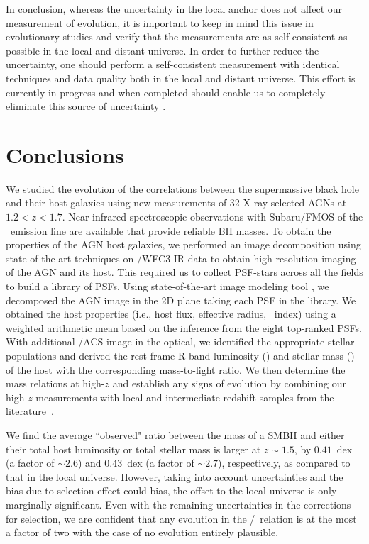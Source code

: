 \documentclass[apj]{emulateapj}
\begin{document}
In conclusion, whereas the uncertainty in the local anchor does not affect our measurement of evolution, it is important to keep in mind this issue in evolutionary studies and verify that the measurements are as self-consistent as possible in the local and distant universe. In order to further reduce the uncertainty, one should perform a self-consistent measurement with identical techniques and data quality both in the local and distant universe. This effort is currently in progress and when completed should enable us to completely eliminate this source of uncertainty \citep{Bennert11,Harris2012, Bennert2015}.


\section{Conclusions} \label{sec:sum}

We studied the evolution of the correlations between the supermassive black hole and their host galaxies using new measurements of 32 X-ray selected AGNs at $1.2<z<1.7$. Near-infrared spectroscopic observations with Subaru/FMOS of the \halpha\ emission line are available that provide reliable BH masses. To obtain the properties of the AGN host galaxies, we performed an image decomposition using state-of-the-art techniques on \hst/WFC3 IR data to obtain high-resolution imaging of the AGN and its host. This required us to collect PSF-stars across all the fields to build a library of PSFs. Using state-of-the-art image modeling tool \lenstronomy, we decomposed the AGN image in the 2D plane taking each PSF in the library. We obtained the host properties (i.e., host flux, effective radius, \sersic\ index) using a weighted arithmetic mean based on the inference from the eight top-ranked PSFs. With additional \hst/ACS image in the optical, we identified the appropriate stellar populations and derived the rest-frame R-band luminosity (\lhost) and stellar mass (\smass) of the host with the corresponding mass-to-light ratio.
We then determine the mass relations at high-$z$ and establish any signs of evolution by combining our high-$z$ measurements with local and intermediate redshift samples from the literature~\citep{Park15, Bennert11, SS13, Cisternas2011}. 

We find the average ``observed" ratio between the mass of a SMBH and either their total host luminosity or total stellar mass is larger at $z\sim1.5$, by $0.41$~dex (a factor of $\sim2.6$) and  $0.43$~dex (a factor of $\sim2.7$), respectively, as compared to that in the local universe. 
However, taking into account uncertainties and the bias due to selection effect could bias, the offset to the local universe is only marginally significant.
Even with the remaining uncertainties in the corrections for selection, we are confident that any evolution in the \mbh/\smass\ relation is at the most a factor of two with the case of no evolution entirely plausible.
\end{document}
